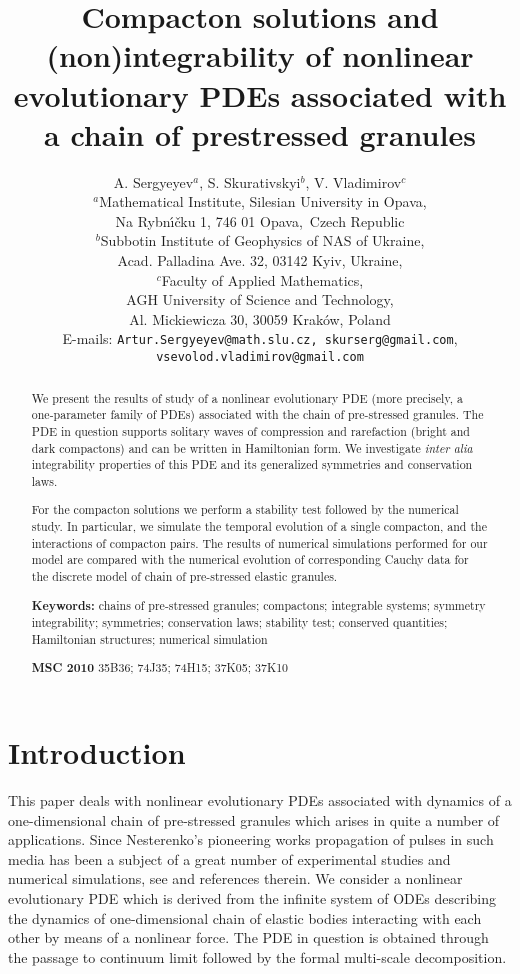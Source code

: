 \documentclass[12pt]{article}
\title{\large\bf Compacton solutions and (non)integrability of nonlinear evolutionary PDEs associated with a chain of prestressed granules}
\author{A. Sergyeyev$^a$, S. Skurativskyi$^b$, V. Vladimirov$^c$\\
$^a$Mathematical Institute, Silesian University in Opava,\\ Na
Rybn\'\i{}\v{c}ku 1, 746 01 Opava,~Czech Republic\\
$^b$Subbotin Institute of Geophysics of NAS of Ukraine,\\ Acad. Palladina Ave. 32, 03142 Kyiv, Ukraine,\\
$^c$Faculty of Applied Mathematics,\\ AGH University of Science
and Technology,\\ Al. Mickiewicza 30, 30059 Krak\'{o}w, Poland\\
E-mails: {\tt Artur.Sergyeyev@math.slu.cz, skurserg@gmail.com},\\ {\tt vsevolod.vladimirov@gmail.com}}
\begin{document}

\maketitle
\begin{abstract}
We present the results of study of a nonlinear evolutionary PDE (more precisely, a one-parameter family of PDEs) associated with the chain of pre-stressed granules. The PDE in question supports solitary waves of compression and rarefaction (bright and dark compactons) and can be written in Hamiltonian form. We investigate {\em inter alia} integrability properties of this PDE and its generalized symmetries and conservation laws.

For the compacton solutions we perform a stability test followed by the numerical study. In particular, we simulate the temporal evolution of a single compacton, and the interactions of compacton pairs. The results of numerical simulations performed for our model are compared with the numerical evolution of corresponding Cauchy data for the discrete model of chain of pre-stressed elastic granules.

{\bf Keywords:}
chains of pre-stressed granules; compactons; %
integrable systems; symmetry integrability;
symmetries; conservation laws; stability test; conserved quantities; Hamiltonian structures; numerical simulation


{\bf MSC 2010} 35B36; 74J35; 74H15; 37K05; 37K10

\end{abstract}




\section{Introduction}
This paper deals with nonlinear evolutionary PDEs associated with dynamics of a one-dimensional chain of pre-stressed granules which arises in quite a number of applications. Since  Ne\-ste\-ren\-ko's pioneering works \cite{Nester_83, Nester_94}  propagation of pulses in such  media has been a subject of a great number of experimental studies and numerical simulations, see \cite{NestLaz_85,Coste_97,Nester_02,Herbold_06,Herbold_07,Ahnert_09, ij, j, Yang_11,lodz2016, vs2018} and references therein.  We consider a nonlinear evolutionary PDE which is derived from the infinite system of ODEs describing the dynamics of one-dimensional chain of elastic bodies  interacting with each other  by means of a nonlinear force. The PDE in question is obtained through the passage to continuum limit  followed by the formal multi-scale decomposition.
\end{document}
